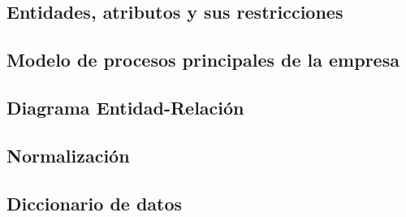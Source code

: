 \documentclass[../main.tex]{subfiles}
\begin{document}
\subsection{Entidades, atributos y sus restricciones}



\subsection{Modelo de procesos principales de la empresa}

\subsection{Diagrama Entidad-Relación}

\subsection{Normalización}

\subsection{Diccionario de datos}


\end{document}

